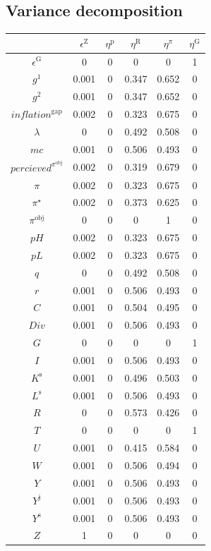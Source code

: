 \subsection{Variance decomposition}

\begin{tabular}{c|ccccc|}
  & $\epsilon^{\mathrm{Z}}$ & $\eta^{\mathrm{p}}$ & $\eta^{\mathrm{R}}$ & $\eta^{\pi}$ & $\eta^{\mathrm{G}}$\\
\hline
$\epsilon^{\mathrm{G}}$ & 0 & 0 & 0 & 0 & 1 \\
$g^{\mathrm{1}}$ & 0.001 & 0 & 0.347 & 0.652 & 0 \\
$g^{\mathrm{2}}$ & 0.001 & 0 & 0.347 & 0.652 & 0 \\
${i\!n\!f\!l\!a\!t\!i\!o\!n}^{\mathrm{gap}}$ & 0.002 & 0 & 0.323 & 0.675 & 0 \\
$\lambda$ & 0 & 0 & 0.492 & 0.508 & 0 \\
${m\!c}$ & 0.001 & 0 & 0.506 & 0.493 & 0 \\
${p\!e\!r\!c\!i\!e\!v\!e\!d}^{\pi^{\mathrm{obj}}}$ & 0.002 & 0 & 0.319 & 0.679 & 0 \\
$\pi$ & 0.002 & 0 & 0.323 & 0.675 & 0 \\
$\pi^{\star}$ & 0.002 & 0 & 0.373 & 0.625 & 0 \\
$\pi^{\mathrm{obj}}$ & 0 & 0 & 0 & 1 & 0 \\
${p\!H}$ & 0.002 & 0 & 0.323 & 0.675 & 0 \\
${p\!L}$ & 0.002 & 0 & 0.323 & 0.675 & 0 \\
$q$ & 0 & 0 & 0.492 & 0.508 & 0 \\
$r$ & 0.001 & 0 & 0.506 & 0.493 & 0 \\
$C$ & 0.001 & 0 & 0.504 & 0.495 & 0 \\
${D\!i\!v}$ & 0.001 & 0 & 0.506 & 0.493 & 0 \\
$G$ & 0 & 0 & 0 & 0 & 1 \\
$I$ & 0.001 & 0 & 0.506 & 0.493 & 0 \\
$K^{\mathrm{s}}$ & 0.001 & 0 & 0.496 & 0.503 & 0 \\
$L^{\mathrm{s}}$ & 0.001 & 0 & 0.506 & 0.493 & 0 \\
$R$ & 0 & 0 & 0.573 & 0.426 & 0 \\
$T$ & 0 & 0 & 0 & 0 & 1 \\
$U$ & 0.001 & 0 & 0.415 & 0.584 & 0 \\
$W$ & 0.001 & 0 & 0.506 & 0.494 & 0 \\
$Y$ & 0.001 & 0 & 0.506 & 0.493 & 0 \\
$Y^{\mathrm{j}}$ & 0.001 & 0 & 0.506 & 0.493 & 0 \\
$Y^{\mathrm{s}}$ & 0.001 & 0 & 0.506 & 0.493 & 0 \\
$Z$ & 1 & 0 & 0 & 0 & 0 \\
\hline
\end{tabular}



